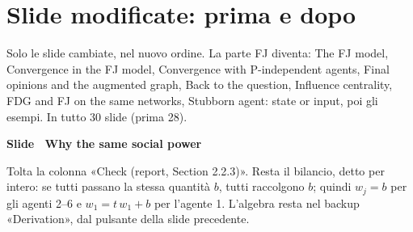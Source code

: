 \section*{Slide modificate: prima e dopo}
Solo le slide cambiate, nel nuovo ordine. La parte FJ diventa: The FJ model, Convergence in the FJ model, Convergence with P-independent agents, Final opinions and the augmented graph, Back to the question, Influence centrality, FDG and FJ on the same networks, Stubborn agent: state or input, poi gli esempi. In tutto 30 slide (prima 28).
\par\addvspace{14pt}\noindent\begin{minipage}{\textwidth}
{\color{unipd}\bfseries Slide  \textperiodcentered\ Why the same social power}\par\smallskip
{\small Tolta la colonna «Check (report, Section 2.2.3)». Resta il bilancio, detto per intero: se tutti passano la stessa quantità $b$, tutti raccolgono $b$; quindi $w_j = b$ per gli agenti 2--6 e $w_1 = t\,w_1 + b$ per l'agente 1. L'algebra resta nel backup «Derivation», dal pulsante della slide precedente.}\par\smallskip
\noindent\begin{minipage}[t]{0.36\textwidth}\par
{}\par\smallskip
\end{minipage}\hfill\begin{minipage}[t]{0.61\textwidth}\par
{}\par\smallskip
\end{minipage}\par
\end{minipage}\par
